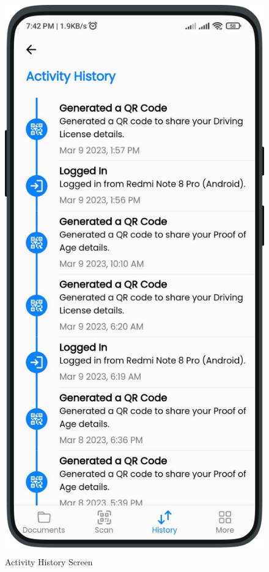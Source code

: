         \begin{multicols}{2}
            \begin{figure}[H]
            \centering
            \includegraphics[width=0.6\linewidth]{images/results/mobile/History.png}
            \caption[Activity History Screen]{Activity History Screen}
            \label{fig:History.png}
            \end{figure} 


\end{multicols}
